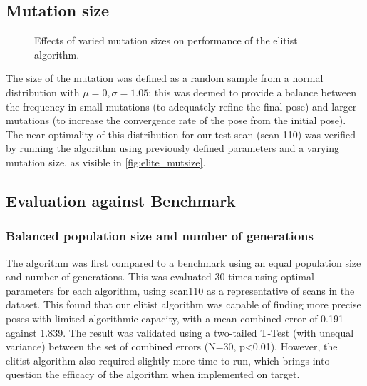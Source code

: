 \documentclass[authoryearcitations]{UoYCSproject}
\begin{document}

\subsection{Mutation size}

\datatableelitemutsize

\begin{figure}
	\centering
	\caption[Optimising mutation step size for the elitist selection algorithm.]{Effects of varied mutation sizes on performance of the elitist algorithm.}
	\label{fig:elite_mutsize}
\end{figure}

The size of the mutation was defined as a random sample from a normal distribution with $\mu=0, \sigma=1.05$; this was deemed to provide a balance between the frequency in small mutations (to adequately refine the final pose) and larger mutations (to increase the convergence rate of the pose from the initial pose). The near-optimality of this distribution for our test scan (scan 110) was verified by running the algorithm using previously defined parameters and a varying mutation size, as visible in \autoref{fig:elite_mutsize}.

\subsection{Evaluation against Benchmark}
\subsubsection{Balanced population size and number of generations}
\label{subsec:ga_vs_elite_eq_pop_gen}
The algorithm was first compared to a benchmark using an equal population size and number of generations. This was evaluated 30 times using optimal parameters for each algorithm, using scan110 as a representative of scans in the dataset. This found that our elitist algorithm was capable of finding more precise poses with limited algorithmic capacity, with a mean combined error of 0.191 against 1.839. The result was validated using a two-tailed T-Test (with unequal variance) between the set of combined errors (N=30, p<0.01). However, the elitist algorithm also required slightly more time to run, which brings into question the efficacy of the algorithm when implemented on target.
\end{document}
